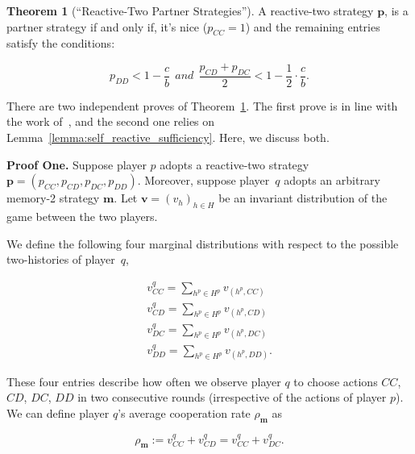 \documentclass{article}
\theoremstyle{definition}
\newtheorem{theorem}{Theorem}[section]
\begin{document}
\begin{theorem}[``Reactive-Two Partner Strategies'']\label{theorem:reactive_two_partner_strategies}
A reactive-two strategy $\mathbf{p}$, is a partner strategy if and only if,
it's nice ($p_{CC} = 1$) and the remaining entries satisfy the conditions:

\begin{equation}\label{eq:two_bit_conditions}
  \displaystyle p_{DD} < 1\!-\! \frac{c}{b}  ~~and~~ \displaystyle \frac{p_{CD} + p_{DC}}{2} < 1- \frac{1}{2} \cdot \frac{c}{b}.
\end{equation}
\end{theorem}

There are two independent proves of
Theorem~\ref{theorem:reactive_two_partner_strategies}. The first prove is
in line with the work of~\citep{akin:EGADS:2016}, and the second one relies on
Lemma~\ref{lemma:self_reactive_sufficiency}. Here, we discuss both.

{\bf Proof One.} Suppose player $p$ adopts a
reactive-two strategy $\mathbf{p}\!=\!(p_{CC},p_{CD}, p_{DC}, p_{DD})$.
Moreover, suppose player~$q$ adopts an arbitrary memory-2 strategy $\mathbf{m}$.
Let $\mathbf{v}=(v_h)_{h\in H}$ be an invariant distribution of the game between
the two players.

We define the following four marginal distributions with respect to the possible two-histories of player~$q$,

\begin{equation}
\begin{array}{l}
\displaystyle v^q_{CC} = \sum_{h^p\in H^p} v_{(h^p,CC)}\\
\displaystyle v^q_{CD} = \sum_{h^p\in H^p} v_{(h^p,CD)}\\
\displaystyle v^q_{DC} = \sum_{h^p\in H^p} v_{(h^p,DC)}\\
\displaystyle v^q_{DD} = \sum_{h^p\in H^p} v_{(h^p,DD)}.
\end{array}
\end{equation}

These four entries describe how often we observe player $q$ to choose actions
$CC$, $CD$, $DC$, $DD$ in two consecutive rounds (irrespective of the actions of
player $p$). We can define player $q$'s average cooperation rate $\rho_\mathbf{m}$ as 

\begin{equation} \label{Eq:rhoq_n2}
\rho_\mathbf{m} := v^q_{CC} + v^q_{CD} = v^q_{CC} + v^q_{DC}.
\end{equation}
\end{document}
